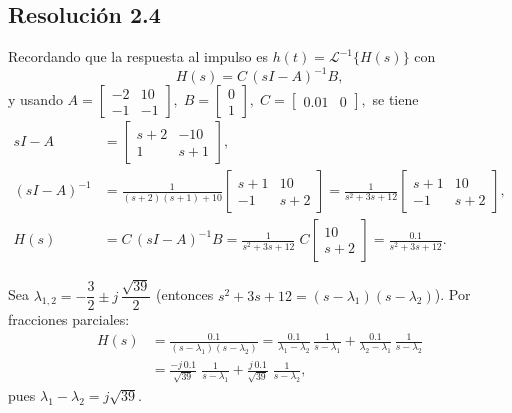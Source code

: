 \documentclass[
  11pt,
  letterpaper,
   addpoints,
   answers
  ]{exam}
\begin{document}
\begin{solution}
\subsection*{Resolución 2.4}

Recordando que la respuesta al impulso es $h(t)=\mathcal{L}^{-1}\{H(s)\}$ con
\begin{equation}
H(s)=C\,(sI-A)^{-1}B,
\end{equation}
y usando
\(
A=\begin{bmatrix}-2&10\\-1&-1\end{bmatrix},\;
B=\begin{bmatrix}0\\1\end{bmatrix},\;
C=\begin{bmatrix}0.01&0\end{bmatrix},
\)
se tiene
\begin{align}
sI-A&=\begin{bmatrix}s+2&-10\\ 1&s+1\end{bmatrix},\\
(sI-A)^{-1}
&=\frac{1}{(s+2)(s+1)+10}
\begin{bmatrix}s+1&10\\ -1&s+2\end{bmatrix}
=\frac{1}{s^2+3s+12}
\begin{bmatrix}s+1&10\\ -1&s+2\end{bmatrix},\\
H(s)&=C\,(sI-A)^{-1}B
=\frac{1}{s^2+3s+12}\;C
\begin{bmatrix}10\\ s+2\end{bmatrix}
=\frac{0.1}{s^2+3s+12}.
\end{align}

Sea
\(
\lambda_{1,2}=-\dfrac{3}{2}\pm j\,\dfrac{\sqrt{39}}{2}
\)
(entonces $s^2+3s+12=(s-\lambda_1)(s-\lambda_2)$). Por fracciones parciales:
\begin{align}
H(s)
&=\frac{0.1}{(s-\lambda_1)(s-\lambda_2)}
=\frac{0.1}{\lambda_1-\lambda_2}\,\frac{1}{s-\lambda_1}
+\frac{0.1}{\lambda_2-\lambda_1}\,\frac{1}{s-\lambda_2} \\
&=\frac{-j\,0.1}{\sqrt{39}}\;\frac{1}{s-\lambda_1}
+\frac{j\,0.1}{\sqrt{39}}\;\frac{1}{s-\lambda_2},
\end{align}
pues $\lambda_1-\lambda_2=j\sqrt{39}$.


\end{solution}
\end{document}
